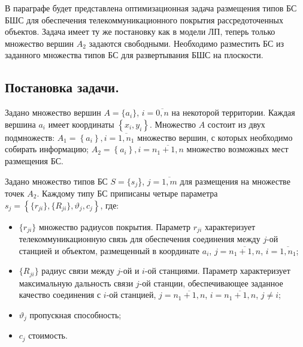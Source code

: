 В параграфе будет представлена оптимизационная задача размещения типов БС БШС для обеспечения телекоммуникационного покрытия рассредоточенных объектов. Задача имеет ту же постановку как в модели ЛП, теперь  только множество вершин $A_2$ задаются свободными. Необходимо разместить БС из заданного множества типов БС для развертывания БШС на плоскости.

\subsection{Постановка задачи.}

Задано множество вершин $A = \{a_i\}$, $i=\overline{0,n}$ на некоторой территории. Каждая вершина $a_i$ имеет координаты $\left\{ x_i, y_i \right\}$.
Множество $A$ состоит из двух подмножеств: $A_1 = \left\{a_i \right\}, i= \overline{1,n_1}$ множество вершин, с которых необходимо собирать информацию; $A_2 = \left\{ a_i  \right\}, i= \overline{n_1+1,n}$ множество возможных мест размещения БС. 










Задано множество типов БС $S = \{s_j$\}, $j=\overline{1,m}$ для размещения на множестве точек $A_2$. Каждому типу БС приписаны четыре параметра $s_j = \left\{\{r_{ji}\}, \{R_{ji}\}, \vartheta_j, c_j \right\}$, где: 
\begin{itemize}
    \item $\{r_{ji}\}$ множество радиусов покрытия. Параметр $r_{ji}$ характеризует телекоммуникационную связь для обеспечения соединения между $j$-ой станцией и объектом, размещенный в координате $a_i$, $j= \overline{n_1+1,n}$, $i= \overline{1,n_1}$;
    \item $\{R_{ji}\}$ радиус связи между $j$-ой и $i$-ой станциями. Параметр характеризует максимальную дальность связи $j$-ой станции, обеспечивающее заданное качество соединения с $i$-ой станцией, $j= \overline{n_1+1,n}$, $i= \overline{n_1+1,n}$, $j \neq i$;
    \item $\vartheta_j$ пропускная способность;
    \item $c_j$ стоимость.
\end{itemize}

